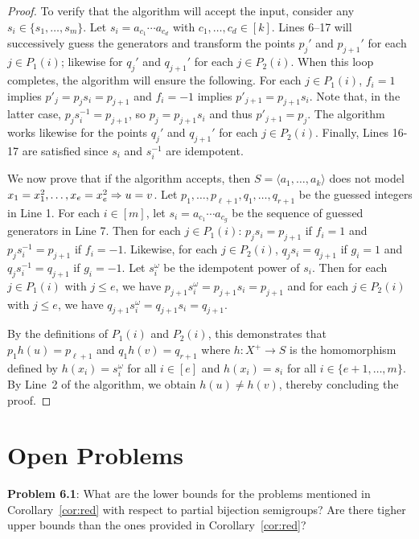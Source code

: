 \documentclass{amsart}
\newcommand{\eq}{\ensuremath\mathrel{=}}
\theoremstyle{remark}
\numberwithin{equation}{section}
\begin{document}
\begin{proof}
  To verify that the algorithm will accept the input, consider any $s_i \in \{s_1,\dots,s_m\}$. Let $s_i = a_{c_1} \cdots a_{c_d}$ with $c_1, \dots, c_d \in [k]$. Lines 6--17 will successively guess the generators and transform the points $p_j'$ and $p_{j+1}'$ for each $j \in P_1(i)$; likewise for $q_j'$ and $q_{j+1}'$ for each $j \in P_2(i)$. When this loop completes, the algorithm will ensure the following. For each $j \in P_1(i)$, $f_i = 1$ implies $p'_j = p_js_i = p_{j+1}$ and $f_i = -1$ implies $p'_{j+1} = p_{j+1}s_i$. Note that, in the latter case, $p_js_i^{-1} = p_{j+1}$, so $p_j = p_{j+1}s_i$ and thus $p'_{j+1} = p_j$. The algorithm works likewise for the points $q_j'$ and $q_{j+1}'$ for each $j \in P_2(i)$. Finally, Lines 16-17 are satisfied since $s_i$ and $s_i^{-1}$ are idempotent.
  
  We now prove that if the algorithm accepts, then $S = \langle a_1,\dots,a_k\rangle$ does not model $x_1 \eq x_1^2,\dots,x_e \eq x_e^2 \Rightarrow u \eq v$.
  Let $p_1,\dots,p_{\ell+1},q_1,\dots,q_{r+1}$ be the guessed integers in Line 1. For each $i \in [m]$, let $s_i = a_{c_1}\cdots a_{c_g}$ be the sequence of guessed generators in Line 7.
  Then for each $j \in P_1(i)$: $p_j s_i = p_{j+1}$ if $f_i=1$ and $p_j s_i^{-1} = p_{j+1}$ if $f_i = -1$. Likewise, for each $j \in P_2(i)$, $q_j s_i = q_{j+1}$ if $g_i=1$ and $q_j s_i^{-1} = q_{j+1}$ if $g_i=-1$. Let $s_i^\omega$ be the idempotent power of $s_i$. Then for each $j \in P_1(i)$ with $j \le e$, we have $p_{j+1}s_i^\omega = p_{j+1} s_i = p_{j+1}$ and for each $j \in P_2(i)$ with $j \le e$, we have $q_{j+1}s_i^\omega = q_{j+1} s_i = q_{j+1}$.
  
  By the definitions of $P_1(i)$ and $P_2(i)$, this demonstrates that $p_1 h(u) = p_{\ell+1}$ and $q_1 h(v) = q_{r+1}$ where $h \colon X^+ \to S$ is the homomorphism defined by $h(x_i) = s_i^\omega$ for all $i \in [e]$ and $h(x_i) = s_i$ for all $i \in \{e+1,\dots,m\}$. By Line~2 of the algorithm, we obtain $h(u) \ne h(v)$, thereby concluding the proof.
\end{proof}

\section{Open Problems}
{\bf Problem 6.1}: What are the lower bounds for the problems mentioned in Corollary~\ref{cor:red} with respect to partial bijection semigroups? Are there tigher upper bounds than the ones provided in Corollary~\ref{cor:red}?
\end{document}
